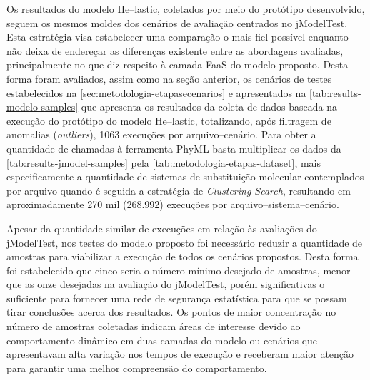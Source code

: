 \documentclass[english,brazilian]{UNISINOSmonografia} %
\begin{document}
Os resultados do modelo \textsf{He}--lastic, coletados por meio do protótipo desenvolvido, seguem os mesmos moldes dos cenários de avaliação centrados no jModelTest.
%
Esta estratégia visa estabelecer uma comparação o mais fiel possível enquanto não deixa de endereçar as diferenças existente entre as abordagens avaliadas, principalmente no que diz respeito à camada FaaS do modelo proposto.
%
Desta forma foram avaliados, assim como na seção anterior, os cenários de testes estabelecidos na \autoref{sec:metodologia-etapasecenarios}
e apresentados na \autoref{tab:results-modelo-samples} que apresenta os resultados da coleta de dados baseada na execução do protótipo do modelo \textsf{He}--lastic, totalizando, após filtragem de anomalias (\textit{outliers}), 1063 execuções por arquivo--cenário.
%
Para obter a quantidade de chamadas à ferramenta PhyML basta multiplicar os dados da \autoref{tab:results-jmodel-samples} pela \autoref{tab:metodologia-etapas-dataset}, mais especificamente a quantidade de sistemas de substituição molecular contemplados por arquivo quando é seguida a estratégia de \textit{Clustering Search}, resultando em aproximadamente 270 mil (268.992) execuções por arquivo--sistema--cenário.


Apesar da quantidade similar de execuções em relação às avaliações do jModelTest, nos testes do modelo proposto foi necessário reduzir a quantidade de amostras para viabilizar a execução de todos os cenários propostos.
%
Desta forma foi estabelecido que cinco seria o número mínimo desejado de amostras, menor que as onze desejadas na avaliação do jModelTest, porém significativas o suficiente para fornecer uma rede de segurança estatística para que se possam tirar conclusões acerca dos resultados.
%
Os pontos de maior concentração no número de amostras coletadas indicam áreas de interesse devido ao comportamento dinâmico em duas camadas do modelo ou cenários que apresentavam alta variação nos tempos de execução e receberam maior atenção para garantir uma melhor compreensão do comportamento.
\end{document}
